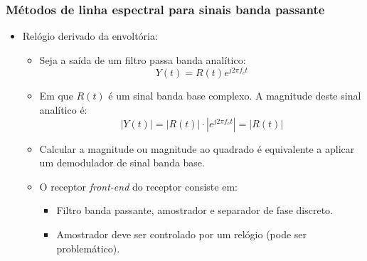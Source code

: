 \begin{frame}
	\frametitle{Métodos de linha espectral para sinais banda passante}
	\begin{itemize}
		\item Relógio derivado da envoltória:
		\begin{itemize}
			\item Seja a saída de um filtro passa banda analítico:
			\begin{equation*}
			Y(t)=R(t)e^{j2\pi f_c t}
			\end{equation*}
			\item Em que $R(t)$ é um sinal banda base complexo. A magnitude deste sinal analítico é:
			\begin{equation*}
			|Y(t)|=|R(t)|\cdot |e^{j2\pi f_c t}| = |R(t)|
			\end{equation*}
			
			\item Calcular a magnitude ou magnitude ao quadrado é equivalente a aplicar um demodulador de sinal banda base.
			\item O receptor \textit{front-end} do receptor consiste em:
			\begin{itemize}
				\item Filtro banda passante, amostrador e separador de fase discreto.
				\item Amostrador deve ser controlado por um relógio (pode ser problemático).
			\end{itemize}
		\end{itemize}
		
	\end{itemize}
\end{frame}

